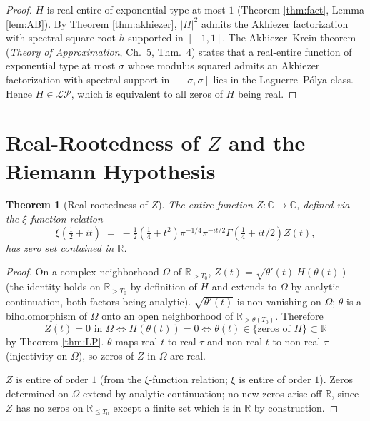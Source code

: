 \documentclass[11pt]{article}
\newtheorem{theorem}{Theorem}
\theoremstyle{definition}
\begin{document}
\begin{proof}
$H$ is real-entire of exponential type at most $1$ (Theorem \ref{thm:fact}, Lemma \ref{lem:AB}). By Theorem \ref{thm:akhiezer}, $|H|^2$ admits the Akhiezer factorization with spectral square root $h$ supported in $[-1, 1]$. The Akhiezer--Krein theorem (\emph{Theory of Approximation}, Ch.~5, Thm.~4) states that a real-entire function of exponential type at most $\sigma$ whose modulus squared admits an Akhiezer factorization with spectral support in $[-\sigma, \sigma]$ lies in the Laguerre--Pólya class. Hence $H \in \mathcal{LP}$, which is equivalent to all zeros of $H$ being real.
\end{proof}

\section{Real-Rootedness of $Z$ and the Riemann Hypothesis}

\begin{theorem}[Real-rootedness of $Z$]\label{thm:Zreal}
The entire function $Z: \mathbb{C} \to \mathbb{C}$, defined via the $\xi$-function relation
\[
\xi(\tfrac12+it) \;=\; -\tfrac12\!\left(\tfrac14 + t^2\right)\pi^{-1/4}\pi^{-it/2}\Gamma\!\left(\tfrac14+it/2\right)Z(t),
\]
has zero set contained in $\mathbb{R}$.
\end{theorem}

\begin{proof}
On a complex neighborhood $\Omega$ of $\mathbb{R}_{>T_0}$, $Z(t) = \sqrt{\theta'(t)}\,H(\theta(t))$ (the identity holds on $\mathbb{R}_{>T_0}$ by definition of $H$ and extends to $\Omega$ by analytic continuation, both factors being analytic). $\sqrt{\theta'(t)}$ is non-vanishing on $\Omega$; $\theta$ is a biholomorphism of $\Omega$ onto an open neighborhood of $\mathbb{R}_{>\theta(T_0)}$. Therefore
\[
Z(t) = 0 \text{ in } \Omega \iff H(\theta(t)) = 0 \iff \theta(t) \in \{\text{zeros of } H\} \subset \mathbb{R}
\]
by Theorem \ref{thm:LP}. $\theta$ maps real $t$ to real $\tau$ and non-real $t$ to non-real $\tau$ (injectivity on $\Omega$), so zeros of $Z$ in $\Omega$ are real.

$Z$ is entire of order $1$ (from the $\xi$-function relation; $\xi$ is entire of order $1$). Zeros determined on $\Omega$ extend by analytic continuation; no new zeros arise off $\mathbb{R}$, since $Z$ has no zeros on $\mathbb{R}_{\le T_0}$ except a finite set which is in $\mathbb{R}$ by construction.
\end{proof}
\end{document}
